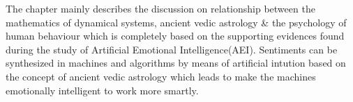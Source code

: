 The chapter mainly describes the discussion on relationship between the mathematics of dynamical systems, ancient vedic astrology \& the psychology of human behaviour which is completely based on the supporting evidences found during the study of Artificial Emotional Intelligence(AEI). Sentiments can be synthesized in machines and algorithms by means of artificial intution based on the concept of ancient vedic astrology which leads to make the machines emotionally intelligent to work more smartly.